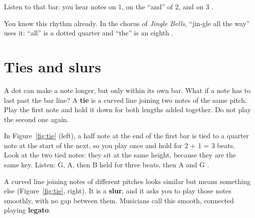 Listen to that bar: you hear notes on 1, on the ``and'' of 2, and on 3 .

You know this rhythm already. In the chorus of \emph{Jingle Bells}, ``jin-gle all the way'' uses it: ``all'' is a dotted quarter and ``the'' is an eighth .

\section{Ties and slurs}

A dot can make a note longer, but only within its own bar. What if a note has to last past the bar line? A \textbf{tie} is a curved line joining two notes of the same pitch. Play the first note and hold it down for both lengths added together. Do not play the second one again.

In Figure~\ref{fig:tie} (left), a half note at the end of the first bar is tied to a quarter note at the start of the next, so you play once and hold for 2 + 1 = 3 beats. Look at the two tied notes: they sit at the same height, because they are the same key. Listen: G, A, then B held for three beats, then A and G .

A curved line joining notes of different pitches looks similar but means something else (Figure~\ref{fig:tie}, right). It is a \textbf{slur}, and it asks you to play those notes smoothly, with no gap between them. Musicians call this smooth, connected playing \textbf{legato}.

